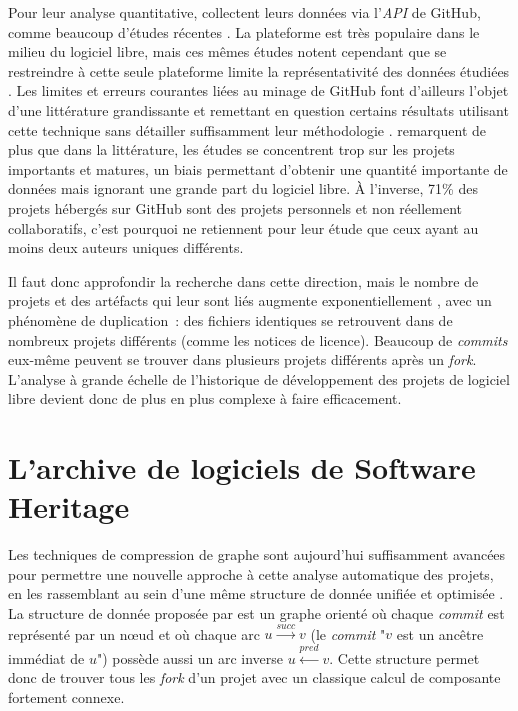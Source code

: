 \documentclass[dvipsnames,runningheads]{llncs}
\newcommand{\en}[1]{\foreignlanguage{english}{\emph{#1}}}
\begin{document}
    Pour leur analyse quantitative, \textcite{signals-2019} collectent leurs données via l'\en{API} de GitHub,
    comme beaucoup d'études récentes \parencite{github-mapping-2017}. La plateforme est très populaire dans le
    milieu du logiciel libre, mais ces mêmes études notent cependant que se restreindre à cette seule
    plateforme limite la représentativité des données étudiées \parencite{swh-growth-2019}. Les limites et
    erreurs courantes liées au minage de GitHub font d'ailleurs l'objet d'une littérature grandissante et
    remettant en question certains résultats utilisant cette technique sans détailler suffisamment leur
    méthodologie \parencite{mining-github-2014,penumbra-oss-2022}. \textcite{barriers-meta-2015} remarquent de
    plus que dans la littérature, les études se concentrent trop sur les projets importants et matures, un
    biais permettant d'obtenir une quantité importante de données mais ignorant une grande part du logiciel
    libre. À l'inverse, 71\% des projets hébergés sur GitHub sont des projets personnels et non réellement
    collaboratifs, c'est pourquoi \textcite{mining-github-2014} ne retiennent pour leur étude que ceux ayant
    au moins deux auteurs uniques différents.

    Il faut donc approfondir la recherche dans cette direction, mais le nombre de projets et des artéfacts qui
    leur sont liés augmente exponentiellement \parencite{swh-growth-2019}, avec un phénomène de duplication :
    des fichiers identiques se retrouvent dans de nombreux projets différents (comme les notices de licence).
    Beaucoup de \en{commits} eux-même peuvent se trouver dans plusieurs projets différents après un \en{fork}.
    L'analyse à grande échelle de l'historique de développement des projets de logiciel libre devient donc de
    plus en plus complexe à faire efficacement.

    \section{L'archive de logiciels de Software Heritage}

    \label{ssec:swh-graph}

    Les techniques de compression de graphe sont aujourd'hui suffisamment avancées pour permettre une nouvelle
    approche à cette analyse automatique des projets, en les rassemblant au sein d'une même structure de
    donnée unifiée et optimisée \parencite{swh-graph-2020}. La structure de donnée proposée par
    \textcite{swh-graph-2020} est un graphe orienté où chaque \en{commit} est représenté par un nœud et où
    chaque arc $u \xrightarrow{succ} v$ (le \en{commit} "$v$ est un ancêtre immédiat de $u$") possède aussi un
    arc inverse $u \xleftarrow{pred} v$. Cette structure permet donc de trouver tous les \en{fork} d'un
    projet avec un classique calcul de composante fortement connexe.
\end{document}
